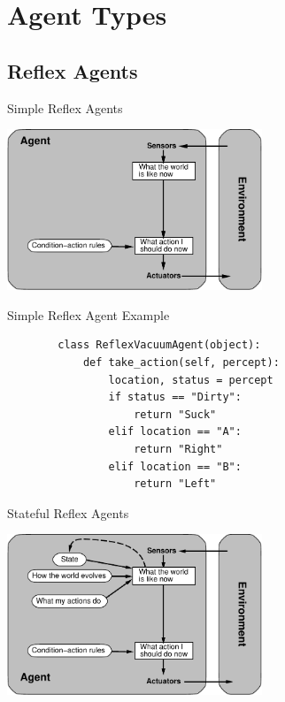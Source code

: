 \documentclass[12pt]{beamer}
\begin{document}
\section{Agent Types}

\subsection{Reflex Agents}

\begin{frame}{Simple Reflex Agents}
	\begin{center}
		\includegraphics[width=3in]{simple-reflex-agent.pdf}
	\end{center}
\end{frame}

\begin{frame}[fragile]{Simple Reflex Agent Example}
	\begin{lstlisting}
		class ReflexVacuumAgent(object):
		    def take_action(self, percept):
		        location, status = percept
		        if status == "Dirty":
		            return "Suck"
		        elif location == "A":
		            return "Right"
		        elif location == "B":
		            return "Left"
	\end{lstlisting}
\end{frame}

\begin{frame}{Stateful Reflex Agents}
	\begin{center}
		\includegraphics[width=3in]{reflex+state-agent.pdf}
	\end{center}
\end{frame}
\end{document}
